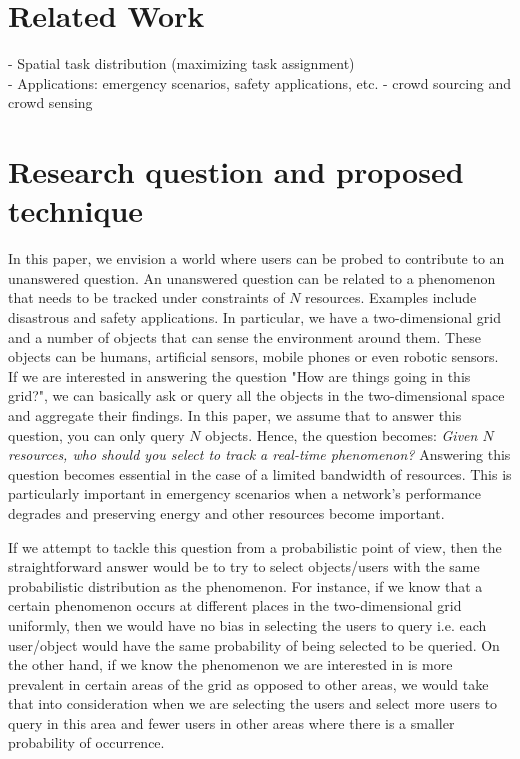 \documentclass{acm_proc_article-sp}
\begin{document}
\section{Related Work}


- Spatial task distribution (maximizing task assignment)\\
- Applications: emergency scenarios, safety applications, etc.
- crowd sourcing and crowd sensing

\section{Research question and proposed technique}
In this paper, we envision a world where users can be probed to contribute to an unanswered question. An unanswered question can be related to a phenomenon that needs to be tracked under  constraints of $N$ resources. Examples include disastrous and safety applications. In particular, we have a two-dimensional grid and a number of objects that can sense the environment around them. These objects can be humans, artificial sensors, mobile phones or even robotic sensors. If we are interested in answering the question "How are things going in this grid?", we can basically ask or query all the objects in the two-dimensional space and aggregate their findings. In this paper, we assume that to answer this question, you can only query $N$ objects. Hence, the question becomes: \textit{Given $N$ resources, who should you select to track a real-time phenomenon?} Answering this question becomes essential in the case of a limited bandwidth of resources. This is particularly important in emergency scenarios when a network's performance degrades and preserving energy and other resources become important.\par
If we attempt to tackle this question from a probabilistic point of view, then the straightforward answer would be to try to select objects/users with the same probabilistic distribution as the phenomenon. For instance, if we know that a certain phenomenon occurs at different places in the two-dimensional grid uniformly, then we would have no bias in selecting the users to query i.e. each user/object would have the same probability of being selected to be queried. On the other hand, if we know the phenomenon we are interested in is more prevalent in certain areas of the grid as opposed to other areas, we would take that into consideration when we are selecting the users and select more users to query in this area and fewer users in other areas where there is a smaller probability of occurrence.\par
\end{document}
